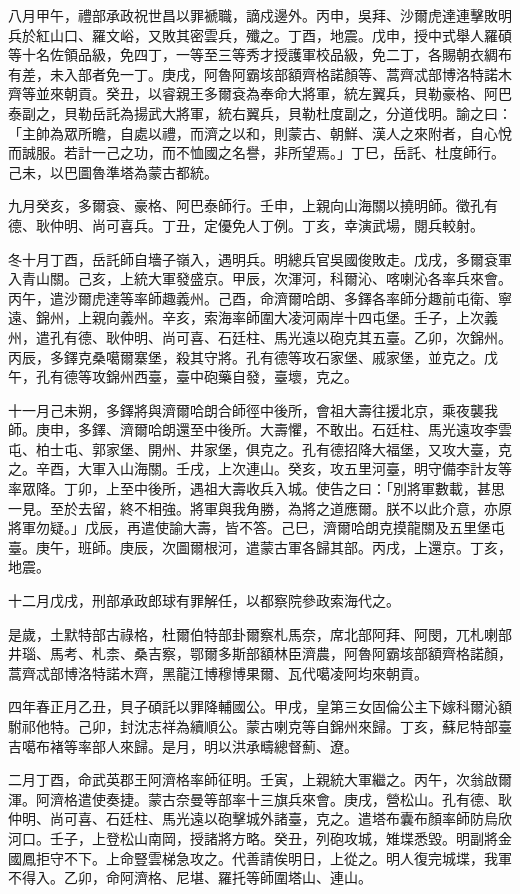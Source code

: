 \begin{pinyinscope}
八月甲午，禮部承政祝世昌以罪褫職，謫戍邊外。丙申，吳拜、沙爾虎達連擊敗明兵於紅山口、羅文峪，又敗其密雲兵，殲之。丁酉，地震。戊申，授中式舉人羅碩等十名佐領品級，免四丁，一等至三等秀才授護軍校品級，免二丁，各賜朝衣綢布有差，未入部者免一丁。庚戌，阿魯阿霸垓部額齊格諾顏等、蒿齊忒部博洛特諾木齊等並來朝貢。癸丑，以睿親王多爾袞為奉命大將軍，統左翼兵，貝勒豪格、阿巴泰副之，貝勒岳託為揚武大將軍，統右翼兵，貝勒杜度副之，分道伐明。諭之曰：「主帥為眾所瞻，自處以禮，而濟之以和，則蒙古、朝鮮、漢人之來附者，自心悅而誠服。若計一己之功，而不恤國之名譽，非所望焉。」丁巳，岳託、杜度師行。己未，以巴圖魯準塔為蒙古都統。

九月癸亥，多爾袞、豪格、阿巴泰師行。壬申，上親向山海關以撓明師。徵孔有德、耿仲明、尚可喜兵。丁丑，定優免人丁例。丁亥，幸演武場，閱兵較射。

冬十月丁酉，岳託師自墻子嶺入，遇明兵。明總兵官吳國俊敗走。戊戌，多爾袞軍入青山關。己亥，上統大軍發盛京。甲辰，次渾河，科爾沁、喀喇沁各率兵來會。丙午，遣沙爾虎達等率師趣義州。己酉，命濟爾哈朗、多鐸各率師分趣前屯衛、寧遠、錦州，上親向義州。辛亥，索海率師圍大凌河兩岸十四屯堡。壬子，上次義州，遣孔有德、耿仲明、尚可喜、石廷柱、馬光遠以砲克其五臺。乙卯，次錦州。丙辰，多鐸克桑噶爾寨堡，殺其守將。孔有德等攻石家堡、戚家堡，並克之。戊午，孔有德等攻錦州西臺，臺中砲藥自發，臺壞，克之。

十一月己未朔，多鐸將與濟爾哈朗合師徑中後所，會祖大壽往援北京，乘夜襲我師。庚申，多鐸、濟爾哈朗還至中後所。大壽懼，不敢出。石廷柱、馬光遠攻李雲屯、柏士屯、郭家堡、開州、井家堡，俱克之。孔有德招降大福堡，又攻大臺，克之。辛酉，大軍入山海關。壬戌，上次連山。癸亥，攻五里河臺，明守備李計友等率眾降。丁卯，上至中後所，遇祖大壽收兵入城。使告之曰：「別將軍數載，甚思一見。至於去留，終不相強。將軍與我角勝，為將之道應爾。朕不以此介意，亦原將軍勿疑。」戊辰，再遣使諭大壽，皆不答。己巳，濟爾哈朗克摸龍關及五里堡屯臺。庚午，班師。庚辰，次圖爾根河，遣蒙古軍各歸其部。丙戌，上還京。丁亥，地震。

十二月戊戌，刑部承政郎球有罪解任，以都察院參政索海代之。

是歲，土默特部古祿格，杜爾伯特部卦爾察札馬奈，席北部阿拜、阿閔，兀札喇部井瑙、馬考、札柰、桑吉察，鄂爾多斯部額林臣濟農，阿魯阿霸垓部額齊格諾顏，蒿齊忒部博洛特諾木齊，黑龍江博穆博果爾、瓦代噶凌阿均來朝貢。

四年春正月乙丑，貝子碩託以罪降輔國公。甲戌，皇第三女固倫公主下嫁科爾沁額駙祁他特。己卯，封沈志祥為續順公。蒙古喇克等自錦州來歸。丁亥，蘇尼特部臺吉噶布褚等率部人來歸。是月，明以洪承疇總督薊、遼。

二月丁酉，命武英郡王阿濟格率師征明。壬寅，上親統大軍繼之。丙午，次翁啟爾渾。阿濟格遣使奏捷。蒙古奈曼等部率十三旗兵來會。庚戌，營松山。孔有德、耿仲明、尚可喜、石廷柱、馬光遠以砲擊城外諸臺，克之。遣塔布囊布顏率師防烏欣河口。壬子，上登松山南岡，授諸將方略。癸丑，列砲攻城，雉堞悉毀。明副將金國鳳拒守不下。上命豎雲梯急攻之。代善請俟明日，上從之。明人復完城堞，我軍不得入。乙卯，命阿濟格、尼堪、羅托等師圍塔山、連山。


\end{pinyinscope}
